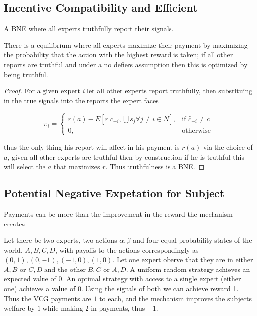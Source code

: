 \subsection{Incentive Compatibility and Efficient}


\begin{defn}
	A BNE where all experts truthfully report their signals.
\end{defn}

There is a  equilibrium where all experts maximize their payment by maximizing the probability that the action with the highest reward is taken; if all other reports are truthful and under a no defiers assumption then this is optimized by being truthful.

\begin{proof}
For a given expert $i$ let all other experts report truthfully, then substituing in the true signals into the reports the expert faces 


\[
    \pi_i = 
\begin{cases}
    r(a) -  E[ r| c_{-i}, \bigcup s_j  \forall j \neq i \in N] ,& \text{if } \hat{c}_{-i} \neq c\\
    0,              & \text{otherwise}
\end{cases}
\]

thus the only thing his report will affect in his payment is $r(a)$ via the choice of $a$, given all other experts are truthful then by construction if he is truthful this will select the $a$ that maximizes $r$. Thus truthfulness is a BNE.

\end{proof}

\subsection{Potential Negative Expetation for Subject}

Payments can be more than the improvement in the reward the mechanism creates . 


\begin{eg}
	Let there be two experts, two actions ${\alpha,\beta}$ and four equal probability states of the world, ${A,B,C,D}$, with payoffs to the actions correspondingly as ${(0,1),(0,-1),(-1,0),(1,0)}$. Let one expert oberve that they are in either ${A,B}$ or ${C,D}$ and the other ${B,C}$ or ${A,D}$. A uniform random strategy achieves an expected value of 0. An optimal strategy with access to a single expert (either one) achieves a value of 0. Using the signals of both we can achieve reward 1. Thus the VCG payments are $1$ to each, and the mechanism improves the subjects welfare by $1$ while making $2$ in payments, thus $-1$. 
\end{eg}




